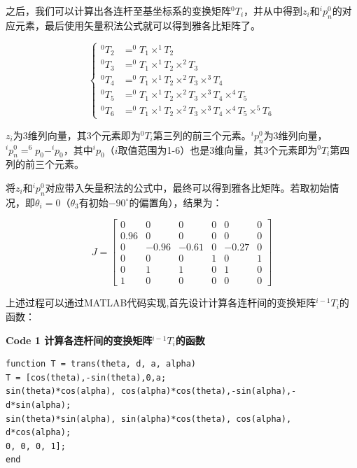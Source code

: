 之后，我们可以计算出各连杆至基坐标系的变换矩阵${^0T}_i$，并从中得到$z_i$和$^ip_n^0$的对应元素，最后使用矢量积法公式就可以得到雅各比矩阵了。

\begin{equation}
    \left\{
        \begin{aligned}
            ^0T_2&=^0T_1 \times ^1T_2\\
            ^0T_3&=^0T_1 \times ^1T_2 \times ^2T_3\\
            ^0T_4&=^0T_1 \times ^1T_2 \times ^2T_3 \times ^3T_4\\
            ^0T_5&=^0T_1 \times ^1T_2 \times ^2T_3 \times ^3T_4 \times ^4T_5\\
            ^0T_6&=^0T_1 \times ^1T_2 \times ^2T_3 \times ^3T_4 \times ^4T_5 \times ^5T_6
        \end{aligned}
    \right.
\end{equation}

$z_i$为3维列向量，其3个元素即为${^0T}_i$第三列的前三个元素。$^ip_n^0$为3维列向量，$^ip_n^0=^6p_0-^ip_0$，其中$^ip_0 $（$i$取值范围为1-6）也是3维向量，其3个元素即为${^0T}_i$第四列的前三个元素。

将$z_i$和$^ip_n^0$对应带入矢量积法的公式中，最终可以得到雅各比矩阵。若取初始情况，即$\theta_i=0$（$\theta_3$有初始$-90^\circ$的偏置角），结果为：

\begin{equation*}
    J=\begin{bmatrix}
        0 & 0 & 0 & 0 & 0 & 0\\
        0.96 & 0 & 0 & 0 & 0 & 0\\
        0 & -0.96 & -0.61 & 0 & -0.27 & 0\\
        0 & 0 & 0 & 1 & 0 & 1\\
        0 & 1 & 1 & 0 & 1 & 0\\
        1 & 0 & 0 & 0 & 0 & 0
    \end{bmatrix}
\end{equation*}

上述过程可以通过MATLAB代码实现,首先设计计算各连杆间的变换矩阵${^{i-1}T}_i$的函数：

\textbf{Code 1 {\quad} 计算各连杆间的变换矩阵${^{i-1}T}_i$的函数}
\begin{lstlisting}
function T = trans(theta, d, a, alpha)
T = [cos(theta),-sin(theta),0,a;
sin(theta)*cos(alpha), cos(alpha)*cos(theta),-sin(alpha),-d*sin(alpha);
sin(theta)*sin(alpha), sin(alpha)*cos(theta), cos(alpha), d*cos(alpha);
0, 0, 0, 1];
end

\end{lstlisting}

